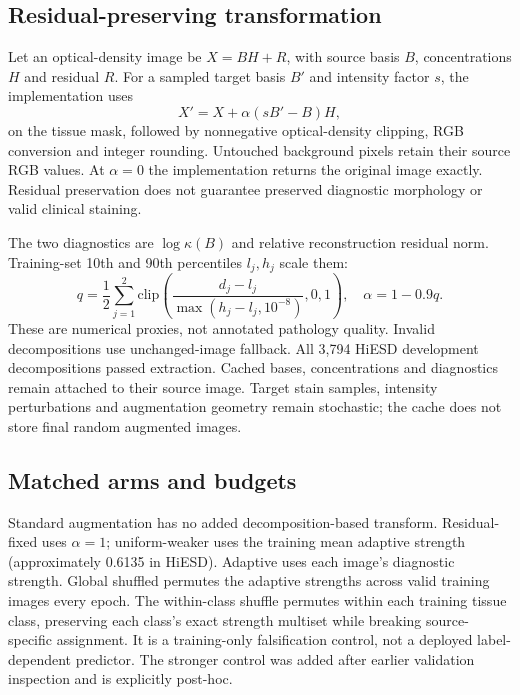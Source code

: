 \documentclass[conference]{IEEEtran}
\begin{document}
\subsection{Residual-preserving transformation}
Let an optical-density image be $X=BH+R$, with source basis $B$, concentrations $H$ and residual $R$. For a sampled target basis $B'$ and intensity factor $s$, the implementation uses
\begin{equation}
 X'=X+\alpha(sB'-B)H,
\end{equation}
on the tissue mask, followed by nonnegative optical-density clipping, RGB conversion and integer rounding. Untouched background pixels retain their source RGB values. At $\alpha=0$ the implementation returns the original image exactly. Residual preservation does not guarantee preserved diagnostic morphology or valid clinical staining.

The two diagnostics are $\log\kappa(B)$ and relative reconstruction residual norm. Training-set 10th and 90th percentiles $l_j,h_j$ scale them:
\begin{equation}
q=\frac12\sum_{j=1}^{2}\mathrm{clip}\left(\frac{d_j-l_j}{\max(h_j-l_j,10^{-8})},0,1\right),
\quad \alpha=1-0.9q.
\end{equation}
These are numerical proxies, not annotated pathology quality. Invalid decompositions use unchanged-image fallback. All 3,794 HiESD development decompositions passed extraction. Cached bases, concentrations and diagnostics remain attached to their source image. Target stain samples, intensity perturbations and augmentation geometry remain stochastic; the cache does not store final random augmented images.

\subsection{Matched arms and budgets}
Standard augmentation has no added decomposition-based transform. Residual-fixed uses $\alpha=1$; uniform-weaker uses the training mean adaptive strength (approximately 0.6135 in HiESD). Adaptive uses each image's diagnostic strength. Global shuffled permutes the adaptive strengths across valid training images every epoch. The within-class shuffle permutes within each training tissue class, preserving each class's exact strength multiset while breaking source-specific assignment. It is a training-only falsification control, not a deployed label-dependent predictor. The stronger control was added after earlier validation inspection and is explicitly post-hoc.
\end{document}
